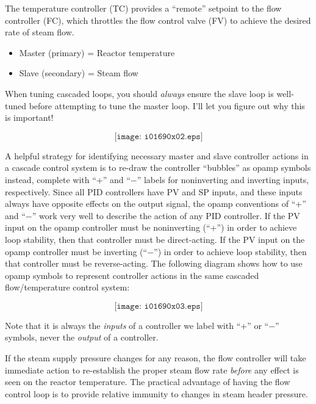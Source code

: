 
The temperature controller (TC) provides a ``remote'' setpoint to the flow controller (FC), which throttles the flow control valve (FV) to achieve the desired rate of steam flow.  

\begin{itemize}
\item{}Master (primary) = Reactor temperature
\item{}Slave (secondary) = Steam flow
\end{itemize} 

When tuning cascaded loops, you should {\it always} ensure the slave loop is well-tuned before attempting to tune the master loop.  I'll let you figure out why this is important!

\vskip 10pt

$$\texttt{[image: i01690x02.eps]}$$

\vskip 10pt

\filbreak

A helpful strategy for identifying necessary master and slave controller actions in a cascade control system is to re-draw the controller ``bubbles'' as opamp symbols instead, complete with ``+'' and ``$-$'' labels for noninverting and inverting inputs, respectively.  Since all PID controllers have PV and SP inputs, and these inputs always have opposite effects on the output signal, the opamp conventions of ``+'' and ``$-$'' work very well to describe the action of any PID controller.  If the PV input on the opamp controller must be noninverting (``+'') in order to achieve loop stability, then that controller must be direct-acting.  If the PV input on the opamp controller must be inverting (``$-$'') in order to achieve loop stability, then that controller must be reverse-acting.  The following diagram shows how to use opamp symbols to represent controller actions in the same cascaded flow/temperature control system:

$$\texttt{[image: i01690x03.eps]}$$

Note that it is always the {\it inputs} of a controller we label with ``+'' or ``$-$'' symbols, never the {\it output} of a controller.







If the steam supply pressure changes for any reason, the flow controller will take immediate action to re-establish the proper steam flow rate {\it before} any effect is seen on the reactor temperature.  The practical advantage of having the flow control loop is to provide relative immunity to changes in steam header pressure.

